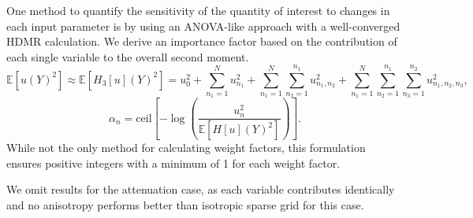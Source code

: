 \documentclass{mc2015}
\newcommand{\expv}[1]{\ensuremath{\mathbb{E}[ #1]}}
\begin{document}
One method to quantify the sensitivity of the quantity of interest to changes in each input parameter is by using an ANOVA-like approach with a well-converged HDMR calculation.  We derive an importance factor based on the contribution of each single variable to the overall second moment.
\begin{equation}
\expv{u(Y)^2} \approx \expv{H_3[u](Y)^2} =
                    u_0^2 + \sum_{n_1=1}^N u_{n_1}^2 + \sum_{n_1=1}^N\sum_{n_2=1}^{n_1} u_{n_1,n_2}^2 + 
                     \sum_{n_1=1}^N\sum_{n_2=1}^{n_1}\sum_{n_3=1}^{n_2}u_{n_1,n_2,n_3}^2,
\end{equation}
\begin{equation}
\alpha_n = \text{ceil}\left[-\log\left(\frac{u_n^2}{\expv{H[u](Y)^2}}\right)\right].
\end{equation}
While not the only method for calculating weight factors, this formulation ensures positive integers with a minimum of 1 for each weight factor.

We omit results for the attenuation case, as each variable contributes identically and no anisotropy performs better than isotropic sparse grid for this case.
\end{document}
